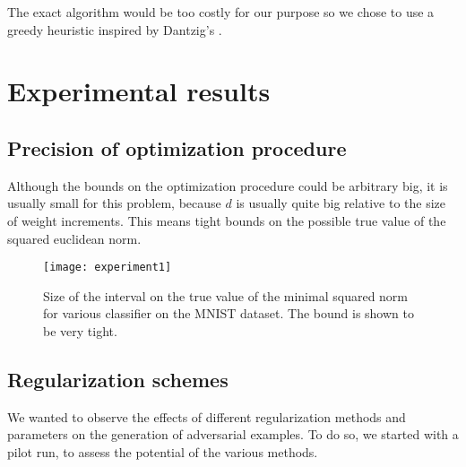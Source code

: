 \documentclass{article} %
\begin{document}
The exact algorithm would be too costly for our purpose so we chose to use a
greedy heuristic inspired by Dantzig's \citep{dantzig_discrete-variable_1957}.




\section{Experimental results}




\subsection{Precision of optimization procedure}

Although the bounds on the optimization procedure could be arbitrary big, it
is usually small for this problem, because $d$ is usually quite big relative
to the size of weight increments. This means tight bounds on the possible
true value of the squared euclidean norm.

\begin{figure}[h!]
\begin{center}
\texttt{[image: experiment1]}
\caption{\small Size of the interval on the true value of the minimal squared norm for various
                classifier on the MNIST dataset. The bound is shown to be very tight.}
\end{center}
\end{figure}




\subsection{Regularization schemes}

We wanted to observe the effects of different regularization methods and
parameters on the generation of adversarial examples. To do so, we started with
a pilot run, to assess the potential of the various methods.


\end{document}
